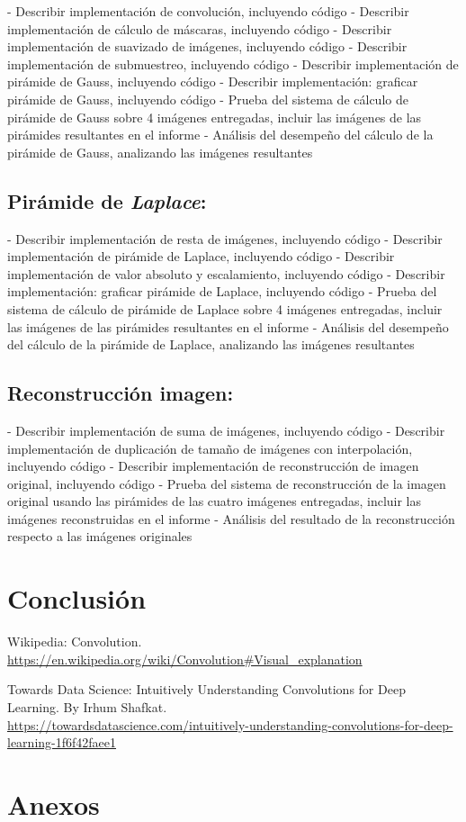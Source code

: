 \bigskip
- Describir implementación de convolución, incluyendo código
- Describir implementación de cálculo de máscaras, incluyendo código
- Describir implementación de suavizado de imágenes, incluyendo código
- Describir implementación de submuestreo, incluyendo código
- Describir implementación de pirámide de Gauss, incluyendo código
- Describir implementación: graficar pirámide de Gauss, incluyendo código
- Prueba del sistema de cálculo de pirámide de Gauss sobre 4 imágenes entregadas, incluir las
imágenes de las pirámides resultantes en el informe
- Análisis del desempeño del cálculo de la pirámide de Gauss, analizando las imágenes resultantes


\subsection{Pirámide de \textit{Laplace}:}
- Describir implementación de resta de imágenes, incluyendo código
- Describir implementación de pirámide de Laplace, incluyendo código
- Describir implementación de valor absoluto y escalamiento, incluyendo código
- Describir implementación: graficar pirámide de Laplace, incluyendo código
- Prueba del sistema de cálculo de pirámide de Laplace sobre 4 imágenes entregadas, incluir las
imágenes de las pirámides resultantes en el informe
- Análisis del desempeño del cálculo de la pirámide de Laplace, analizando las imágenes resultantes


\subsection{Reconstrucción imagen:}
- Describir implementación de suma de imágenes, incluyendo código
- Describir implementación de duplicación de tamaño de imágenes con interpolación, incluyendo
código
- Describir implementación de reconstrucción de imagen original, incluyendo código
- Prueba del sistema de reconstrucción de la imagen original usando las pirámides de las cuatro
imágenes entregadas, incluir las imágenes reconstruidas en el informe
- Análisis del resultado de la reconstrucción respecto a las imágenes originales


\section{Conclusión}


\newpage
\begin{thebibliography}{X}
     Wikipedia: Convolution. \\
    \url{https://en.wikipedia.org/wiki/Convolution#Visual_explanation} 

     Towards Data Science: Intuitively Understanding Convolutions for Deep Learning. By Irhum Shafkat. \\
    \url{https://towardsdatascience.com/intuitively-understanding-convolutions-for-deep-learning-1f6f42faee1} 

\end{thebibliography}

\section{Anexos}
